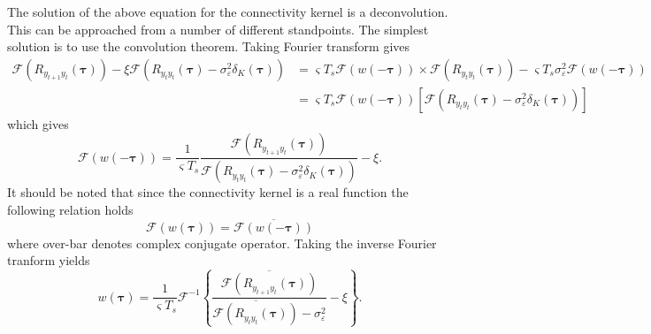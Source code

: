 \documentclass[]{article}
\begin{document}
The solution of the above equation for the connectivity kernel is a deconvolution. This can be approached from a number of different standpoints. The simplest solution is to use the convolution theorem. Taking Fourier transform gives
\begin{align}
 \mathcal{F}\left(R_{y_{t+1}y_t}(\boldsymbol{\tau})\right)-\xi\mathcal{F}\left(R_{y_ty_t}(\boldsymbol{\tau})-\sigma^2_{\varepsilon}\delta_K(\boldsymbol\tau)\right)&=\varsigma T_s\mathcal{F}\left(w(-\boldsymbol\tau)\right)\times \mathcal F\left(R_{y_ty_t}(\boldsymbol\tau)\right)-\varsigma T_s\sigma_{\varepsilon}^2\mathcal{F}\left(w(-\boldsymbol\tau)\right) \nonumber \\
&=\varsigma T_s\mathcal{F}\left(w(-\boldsymbol\tau)\right)\left[\mathcal{F}\left(R_{y_ty_t}(\boldsymbol{\tau})-\sigma^2_{\varepsilon}\delta_K(\boldsymbol\tau)\right) \right] 
\end{align}
 which gives
\begin{equation}\label{eq:FourierKernelSolution}
	\mathcal{F}\left(w(-\boldsymbol\tau)\right) = \frac{1}{\varsigma T_s}\frac{\mathcal{F}\left(R_{y_{t+1}y_t}(\boldsymbol{\tau})\right)}{\mathcal{F}\left(R_{y_ty_t}(\boldsymbol{\tau})-\sigma^2_{\varepsilon}\delta_K(\boldsymbol\tau)\right)}-\xi.
\end{equation}
It should be noted that since the connectivity kernel is a real function the following relation holds \cite{Bracewell2000}
\begin{equation}
 \mathcal{F}\left(w(\boldsymbol\tau)\right)=\overline{\mathcal{F}\left(w(-\boldsymbol\tau)\right)}
\end{equation}
where over-bar denotes complex conjugate operator. Taking the inverse Fourier tranform yields
\begin{equation}\label{eq:KernelSolution}
	w(\boldsymbol{\tau}) = \frac{1}{\varsigma T_s}\mathcal{F}^{-1}\left\{\frac{\overline{\mathcal{F}\left(R_{y_{t+1}y_t}(\boldsymbol{\tau})\right)}}{\overline{\mathcal{F}\left(R_{y_ty_t}(\boldsymbol{\tau})\right)}-\sigma^2_{\varepsilon}}-\xi\right\}.
\end{equation}

\newpage
\end{document}
